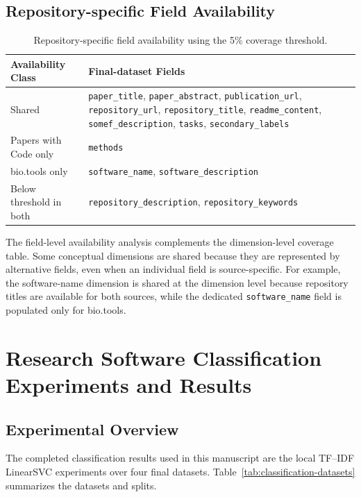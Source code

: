 \documentclass[pdflatex,sn-mathphys-num]{sn-jnl}%
\theoremstyle{thmstyleone}%
\theoremstyle{thmstyletwo}%
\theoremstyle{thmstylethree}%
\begin{document}
\subsection{Repository-specific Field Availability}
\label{subsec:repository-specific-availability}

\begin{table}[htbp]
\centering
\small
\caption{Repository-specific field availability using the 5\% coverage threshold.}
\label{tab:repository-specific-attribute-availability}
\begin{tabularx}{\textwidth}{p{3.2cm}X}
\toprule
Availability Class & Final-dataset Fields \\
\midrule
Shared & \texttt{paper\_title}, \texttt{paper\_abstract}, \texttt{publication\_url}, \texttt{repository\_url}, \texttt{repository\_title}, \texttt{readme\_content}, \texttt{somef\_description}, \texttt{tasks}, \texttt{secondary\_labels} \\
Papers with Code only & \texttt{methods} \\
bio.tools only & \texttt{software\_name}, \texttt{software\_description} \\
Below threshold in both & \texttt{repository\_description}, \texttt{repository\_keywords} \\
\bottomrule
\end{tabularx}
\end{table}

The field-level availability analysis complements the dimension-level coverage table. Some conceptual dimensions are shared because they are represented by alternative fields, even when an individual field is source-specific. For example, the software-name dimension is shared at the dimension level because repository titles are available for both sources, while the dedicated \texttt{software\_name} field is populated only for bio.tools.

\section{Research Software Classification Experiments and Results}
\label{sec:classification-results}

\subsection{Experimental Overview}
\label{subsec:classification-overview}

The completed classification results used in this manuscript are the local TF--IDF LinearSVC experiments over four final datasets. Table~\ref{tab:classification-datasets} summarizes the datasets and splits.
\end{document}

